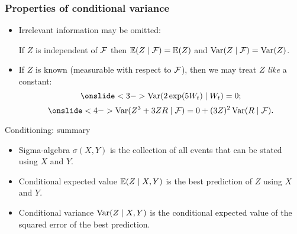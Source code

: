 \begin{frame}
    \frametitle{Properties of conditional variance}

    \begin{itemize}[<+->]
        \item Irrelevant information may be omitted:
        
        If $Z$ is \alert{independent} of $\mathcal{F}$ then $\mathbb{E}(Z \mid \mathcal{F}) = \mathbb{E}(Z)$ and $\operatorname{Var}(Z \mid \mathcal{F}) = \operatorname{Var}(Z)$.
        

        \item If $Z$ is \alert{known} (measurable with respect to $\mathcal{F}$), 
        then we may treat $Z$ \textit{like} a constant:
        \[
            \onslide<3->{\Var(2\exp(5W_t) \mid W_t) = 0;}
        \]
        \[
            \onslide<4->{\Var(Z^3  + 3Z R \mid \cF ) = 0 + (3Z)^2\Var(R \mid \cF).}
        \]
            
    \end{itemize}


\end{frame}


    \begin{frame}{Conditioning: summary}
    
    \begin{itemize}[<+->]
        \item Sigma-algebra $\sigma(X, Y)$ is the collection of all events that \alert{can be stated} using $X$ and $Y$.
        \item Conditional expected value $\mathbb{E}(Z \mid X, Y)$ is the \alert{best prediction} of $Z$ using $X$ and $Y$.
        \item Conditional variance $\operatorname{Var}(Z \mid X, Y)$ is the conditional expected value of the \alert{squared error} of the best prediction.
    \end{itemize}
      
    \end{frame}
    